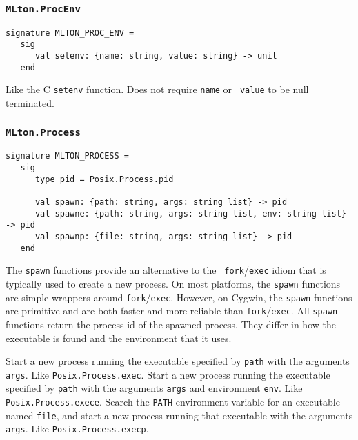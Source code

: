 \subsubsection{\tt MLton.ProcEnv}

\begin{verbatim}
signature MLTON_PROC_ENV =
   sig
      val setenv: {name: string, value: string} -> unit
   end
\end{verbatim}

\begin{description}
Like the C {\tt setenv} function.  Does not require {\tt name} or {\tt
value} to be null terminated.
\end{description}
%
\subsubsection{\tt MLton.Process}

\begin{verbatim}
signature MLTON_PROCESS =
   sig
      type pid = Posix.Process.pid

      val spawn: {path: string, args: string list} -> pid
      val spawne: {path: string, args: string list, env: string list} -> pid
      val spawnp: {file: string, args: string list} -> pid
   end
\end{verbatim}

The {\tt spawn} functions provide an alternative to the {\tt
fork}/{\tt exec} idiom that is typically used to create a new process.
On most platforms, the {\tt spawn} functions are simple wrappers
around {\tt fork}/{\tt exec}.  However, on Cygwin, the {\tt spawn}
functions are primitive and are both faster and more reliable than
{\tt fork}/{\tt exec}.  All {\tt spawn} functions return the process
id of the spawned process.  They differ in how the executable is found
and the environment that it uses.

\begin{description}
Start a new process running the executable specified by {\tt path} with the
arguments {\tt args}.  Like {\tt Posix.Process.exec}.
Start a new process running the executable specified by {\tt path} with the
arguments {\tt args} and environment {\tt env}.  Like {\tt Posix.Process.exece}.
Search the {\tt PATH} environment variable for an executable named {\tt file},
and start a new process running that executable with the arguments {\tt args}.
Like {\tt Posix.Process.execp}.
\end{description}

